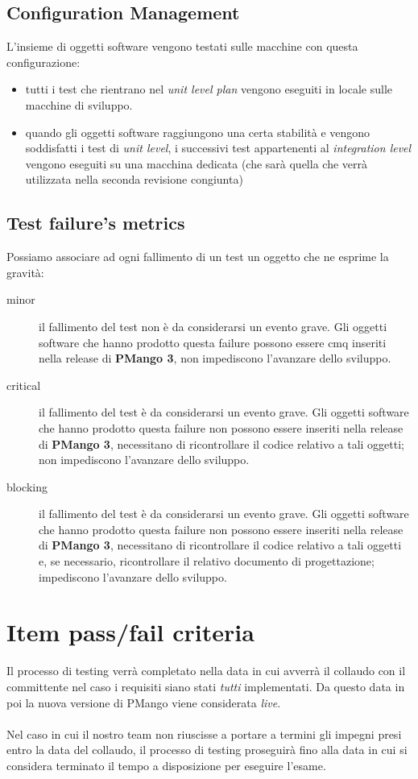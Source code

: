 \subsection{Configuration Management}
L'insieme di oggetti software vengono testati sulle macchine con questa
configurazione:
\begin{itemize}
  \item tutti i test che rientrano nel \emph{unit level plan} vengono eseguiti
  in locale sulle macchine di sviluppo.
  \item quando gli oggetti software raggiungono una certa stabilit\`a e vengono
  soddisfatti i test di \emph{unit level}, i successivi test appartenenti al
  \emph{integration level} vengono eseguiti su una macchina dedicata (che
  sar\`a quella che verr\`a utilizzata nella seconda revisione congiunta)
\end{itemize}

\subsection{Test failure's metrics}
Possiamo associare ad ogni fallimento di un test un oggetto che ne esprime la
gravit\`a:
\begin{description}
  \item[minor] il fallimento del test non \`e da considerarsi un evento grave.
  Gli oggetti software che hanno prodotto questa failure possono essere cmq
  inseriti nella release di \textbf{PMango 3}, non impediscono l'avanzare dello
  sviluppo.
  \item[critical] il fallimento del test \`e da considerarsi un evento grave.
  Gli oggetti software che hanno prodotto questa failure non possono essere
  inseriti nella release di \textbf{PMango 3}, necessitano di ricontrollare il
  codice relativo a tali oggetti; non impediscono l'avanzare dello sviluppo.
  \item[blocking] il fallimento del test \`e da considerarsi un evento grave.
  Gli oggetti software che hanno prodotto questa failure non possono essere
  inseriti nella release di \textbf{PMango 3}, necessitano di ricontrollare il
  codice relativo a tali oggetti e, se necessario, ricontrollare il relativo
  documento di progettazione; impediscono l'avanzare dello sviluppo.
\end{description}

\section{Item pass/fail criteria}
Il processo di testing verr\`a completato nella data in cui avverr\`a il
collaudo con il committente nel caso i requisiti siano stati \emph{tutti}
implementati. Da questo data in poi la nuova versione di PMango viene
considerata \emph{live}. \\ \\
Nel caso in cui il nostro team non riuscisse a portare a termini
gli impegni presi entro la data del collaudo, il processo di testing
proseguir\`a fino alla data in cui si considera terminato il tempo a 
disposizione per eseguire l'esame.

